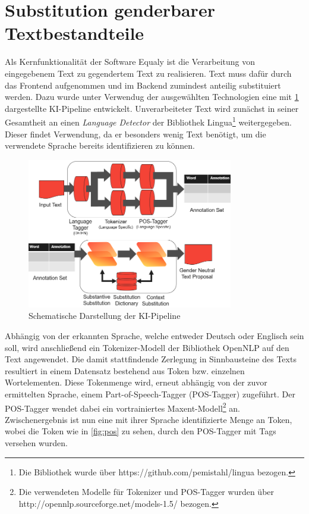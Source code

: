 \section{Substitution genderbarer Textbestandteile}
\label{sec:substitution}

Als Kernfunktionalität der Software Equaly ist die Verarbeitung von eingegebenem Text zu gegendertem Text zu realisieren. Text muss dafür durch das Frontend aufgenommen und im Backend zumindest anteilig substituiert werden. Dazu wurde unter Verwendug der ausgewählten Technologien eine mit \ref{fig:pipeline} dargestellte KI-Pipeline entwickelt. Unverarbeiteter Text wird zunächst in seiner Gesamtheit an einen \textit{Language Detector} der Bibliothek Lingua\footnote{Die Bibliothek wurde über https://github.com/pemistahl/lingua bezogen.} weitergegeben. Dieser findet Verwendung, da er besonders wenig Text benötigt, um die verwendete Sprache bereits identifizieren zu können.

\begin{figure}[!th]
\centering
\includegraphics[width=9cm]{Resources/Pipeline.PNG}
\caption{Schematische Darstellung der KI-Pipeline}
\label{fig:pipeline}
\end{figure}

Abhängig von der erkannten Sprache, welche entweder Deutsch oder Englisch sein soll, wird anschließend ein Tokenizer-Modell der Bibliothek OpenNLP auf den Text angewendet. Die damit stattfindende Zerlegung in Sinnbausteine des Texts resultiert in einem Datensatz bestehend aus Token bzw. einzelnen Wortelementen. Diese Tokenmenge wird, erneut abhängig von der zuvor ermittelten Sprache, einem Part-of-Speech-Tagger (POS-Tagger) zugeführt. Der POS-Tagger wendet dabei ein vortrainiertes Maxent-Modell\footnote{Die verwendeten Modelle für Tokenizer und POS-Tagger wurden über http://opennlp.sourceforge.net/models-1.5/ bezogen.} an. Zwischenergebnis ist nun eine mit ihrer Sprache identifizierte Menge an Token, wobei die Token wie in \ref{fig:pos} zu sehen, durch den POS-Tagger mit Tags versehen wurden.

